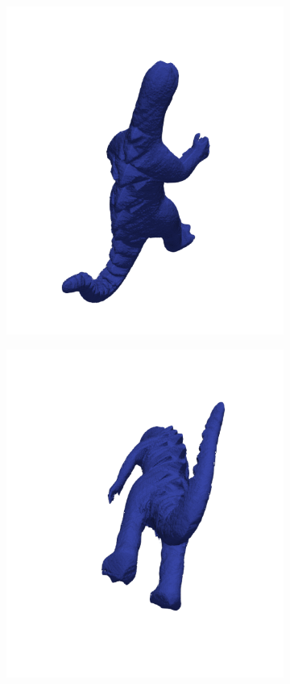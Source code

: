 \begin{figure}[ht]
  \centering
  \begin{subfigure}[b]{0.4\textwidth}
    \centering
    \includegraphics[width=\textwidth]{images/q2_dino_view_1.png}
    \caption{}
  \end{subfigure}
  \hspace{1em}
  \begin{subfigure}[b]{0.4\textwidth}
    \centering
    \includegraphics[width=\textwidth]{images/q2_dino_view_2.png}

\end{subfigure}
\end{figure}
